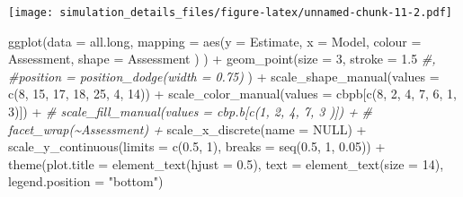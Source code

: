 \documentclass[
]{article}
\newenvironment{Shaded}{\begin{snugshade}}{\end{snugshade}}
\newcommand{\AttributeTok}[1]{\textcolor[rgb]{0.77,0.63,0.00}{#1}}
\newcommand{\CommentTok}[1]{\textcolor[rgb]{0.56,0.35,0.01}{\textit{#1}}}
\newcommand{\ConstantTok}[1]{\textcolor[rgb]{0.00,0.00,0.00}{#1}}
\newcommand{\DecValTok}[1]{\textcolor[rgb]{0.00,0.00,0.81}{#1}}
\newcommand{\FloatTok}[1]{\textcolor[rgb]{0.00,0.00,0.81}{#1}}
\newcommand{\FunctionTok}[1]{\textcolor[rgb]{0.00,0.00,0.00}{#1}}
\newcommand{\NormalTok}[1]{#1}
\newcommand{\SpecialCharTok}[1]{\textcolor[rgb]{0.00,0.00,0.00}{#1}}
\newcommand{\StringTok}[1]{\textcolor[rgb]{0.31,0.60,0.02}{#1}}
\begin{document}
\texttt{[image: simulation\_details\_files/figure-latex/unnamed-chunk-11-2.pdf]}

\begin{Shaded}
\begin{Highlighting}[]
\FunctionTok{ggplot}\NormalTok{(}\AttributeTok{data =}\NormalTok{ all.long,}
       \AttributeTok{mapping =} \FunctionTok{aes}\NormalTok{(}\AttributeTok{y =}\NormalTok{ Estimate,}
                     \AttributeTok{x =}\NormalTok{ Model, }
                     \AttributeTok{colour =}\NormalTok{ Assessment,}
                     \AttributeTok{shape =}\NormalTok{ Assessment}
\NormalTok{                     )}
\NormalTok{       ) }\SpecialCharTok{+}
  \FunctionTok{geom\_point}\NormalTok{(}\AttributeTok{size =} \DecValTok{3}\NormalTok{, }\AttributeTok{stroke =} \FloatTok{1.5}
             \CommentTok{\#,}
             \CommentTok{\#position = position\_dodge(width = 0.75)}
\NormalTok{             ) }\SpecialCharTok{+}
  \FunctionTok{scale\_shape\_manual}\NormalTok{(}\AttributeTok{values =} \FunctionTok{c}\NormalTok{(}\DecValTok{8}\NormalTok{, }\DecValTok{15}\NormalTok{, }\DecValTok{17}\NormalTok{, }\DecValTok{18}\NormalTok{, }\DecValTok{25}\NormalTok{, }\DecValTok{4}\NormalTok{, }\DecValTok{14}\NormalTok{)) }\SpecialCharTok{+}
  \FunctionTok{scale\_color\_manual}\NormalTok{(}\AttributeTok{values =}\NormalTok{ cbpb[}\FunctionTok{c}\NormalTok{(}\DecValTok{8}\NormalTok{, }\DecValTok{2}\NormalTok{, }\DecValTok{4}\NormalTok{, }\DecValTok{7}\NormalTok{, }\DecValTok{6}\NormalTok{, }\DecValTok{1}\NormalTok{, }\DecValTok{3}\NormalTok{)]) }\SpecialCharTok{+}
  \CommentTok{\# scale\_fill\_manual(values = cbp.b[c(1, 2, 4, 7, 3 )]) +}
  \CommentTok{\# facet\_wrap(\textasciitilde{}Assessment) +}
  \FunctionTok{scale\_x\_discrete}\NormalTok{(}\AttributeTok{name =} \ConstantTok{NULL}\NormalTok{) }\SpecialCharTok{+}
  \FunctionTok{scale\_y\_continuous}\NormalTok{(}\AttributeTok{limits =} \FunctionTok{c}\NormalTok{(}\FloatTok{0.5}\NormalTok{, }\DecValTok{1}\NormalTok{),}
                     \AttributeTok{breaks =} \FunctionTok{seq}\NormalTok{(}\FloatTok{0.5}\NormalTok{, }\DecValTok{1}\NormalTok{, }\FloatTok{0.05}\NormalTok{)) }\SpecialCharTok{+}
  \FunctionTok{theme}\NormalTok{(}\AttributeTok{plot.title =} \FunctionTok{element\_text}\NormalTok{(}\AttributeTok{hjust =} \FloatTok{0.5}\NormalTok{), }
        \AttributeTok{text =} \FunctionTok{element\_text}\NormalTok{(}\AttributeTok{size =} \DecValTok{14}\NormalTok{),}
        \AttributeTok{legend.position =} \StringTok{"bottom"}\NormalTok{)}
\end{Highlighting}
\end{Shaded}
\end{document}
